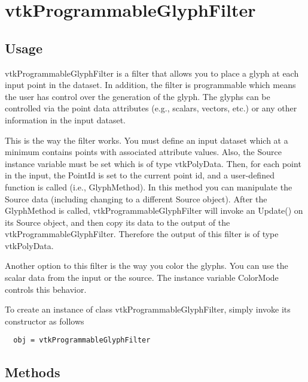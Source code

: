\section{vtkProgrammableGlyphFilter}

\subsection{Usage}

 vtkProgrammableGlyphFilter is a filter that allows you to place a glyph at
 each input point in the dataset. In addition, the filter is programmable
 which means the user has control over the generation of the glyph. The
 glyphs can be controlled via the point data attributes (e.g., scalars,
 vectors, etc.) or any other information in the input dataset.

 This is the way the filter works. You must define an input dataset which
 at a minimum contains points with associated attribute values. Also, the
 Source instance variable must be set which is of type vtkPolyData. Then,
 for each point in the input, the PointId is set to the current point id,
 and a user-defined function is called (i.e., GlyphMethod). In this method
 you can manipulate the Source data (including changing to a different
 Source object). After the GlyphMethod is called,
 vtkProgrammableGlyphFilter will invoke an Update() on its Source object,
 and then copy its data to the output of the
 vtkProgrammableGlyphFilter. Therefore the output of this filter is of type
 vtkPolyData.

 Another option to this filter is the way you color the glyphs. You can use
 the scalar data from the input or the source. The instance variable
 ColorMode controls this behavior.

To create an instance of class vtkProgrammableGlyphFilter, simply
invoke its constructor as follows
\begin{verbatim}
  obj = vtkProgrammableGlyphFilter
\end{verbatim}
\subsection{Methods}

